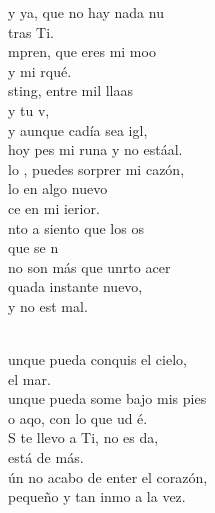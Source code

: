 \documentclass[12pt]{article}
\begin{document}
\begin{multicols*}{2}
\begin{cancion}%
	y ya, que no hay nada nu  \\
	tras  Ti.\\
	mpren, que eres mi moo \\
	y mi rqué.\\
	sting, entre mil llaas \\
	y tu v,\\
	y aunque cadía sea igl,\\
	hoy pes mi runa y no estáal.\\
\jump
	lo , puedes sorprer mi cazón,\\
	lo en  algo nuevo \\
	ce en mi ierior.\\
	nto a  siento que los os \\
	que se n\\
	no son más que unrto acer\\
	quada instante  nuevo, \\
	y no est mal.\\\jump\\
	\begin{chorus}%
	unque pueda conquis el cielo, \\
el mar.\\
	unque pueda some bajo mis pies\\
	o aqo, con lo que ud é. \\
	S te llevo a Ti, no es da, \\
está de más.\\
	ún no acabo de enter el corazón,\\
	 pequeño y tan inmo a la vez.\\

\end{chorus}
\end{cancion}
\end{multicols*}
\end{document}

